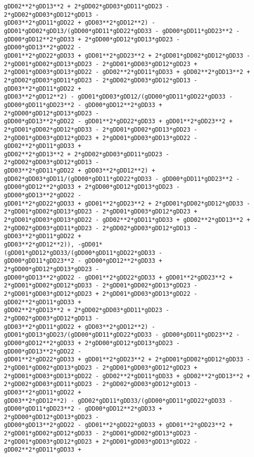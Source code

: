 \documentclass[landscape,letterpaper,10pt,english]{article}
\begin{document}
\begin{Verbatim}[commandchars=\\\{\}]
gDD02**2*gDD13**2 + 2*gDD02*gDD03*gDD11*gDD23 - 2*gDD02*gDD03*gDD12*gDD13 -
gDD03**2*gDD11*gDD22 + gDD03**2*gDD12**2) -
gDD01*gDD02*gDD13/(gDD00*gDD11*gDD22*gDD33 - gDD00*gDD11*gDD23**2 -
gDD00*gDD12**2*gDD33 + 2*gDD00*gDD12*gDD13*gDD23 - gDD00*gDD13**2*gDD22 -
gDD01**2*gDD22*gDD33 + gDD01**2*gDD23**2 + 2*gDD01*gDD02*gDD12*gDD33 -
2*gDD01*gDD02*gDD13*gDD23 - 2*gDD01*gDD03*gDD12*gDD23 +
2*gDD01*gDD03*gDD13*gDD22 - gDD02**2*gDD11*gDD33 + gDD02**2*gDD13**2 +
2*gDD02*gDD03*gDD11*gDD23 - 2*gDD02*gDD03*gDD12*gDD13 - gDD03**2*gDD11*gDD22 +
gDD03**2*gDD12**2) - gDD01*gDD03*gDD12/(gDD00*gDD11*gDD22*gDD33 -
gDD00*gDD11*gDD23**2 - gDD00*gDD12**2*gDD33 + 2*gDD00*gDD12*gDD13*gDD23 -
gDD00*gDD13**2*gDD22 - gDD01**2*gDD22*gDD33 + gDD01**2*gDD23**2 +
2*gDD01*gDD02*gDD12*gDD33 - 2*gDD01*gDD02*gDD13*gDD23 -
2*gDD01*gDD03*gDD12*gDD23 + 2*gDD01*gDD03*gDD13*gDD22 - gDD02**2*gDD11*gDD33 +
gDD02**2*gDD13**2 + 2*gDD02*gDD03*gDD11*gDD23 - 2*gDD02*gDD03*gDD12*gDD13 -
gDD03**2*gDD11*gDD22 + gDD03**2*gDD12**2) +
gDD02*gDD03*gDD11/(gDD00*gDD11*gDD22*gDD33 - gDD00*gDD11*gDD23**2 -
gDD00*gDD12**2*gDD33 + 2*gDD00*gDD12*gDD13*gDD23 - gDD00*gDD13**2*gDD22 -
gDD01**2*gDD22*gDD33 + gDD01**2*gDD23**2 + 2*gDD01*gDD02*gDD12*gDD33 -
2*gDD01*gDD02*gDD13*gDD23 - 2*gDD01*gDD03*gDD12*gDD23 +
2*gDD01*gDD03*gDD13*gDD22 - gDD02**2*gDD11*gDD33 + gDD02**2*gDD13**2 +
2*gDD02*gDD03*gDD11*gDD23 - 2*gDD02*gDD03*gDD12*gDD13 - gDD03**2*gDD11*gDD22 +
gDD03**2*gDD12**2)), -gDD01*(gDD01*gDD12*gDD33/(gDD00*gDD11*gDD22*gDD33 -
gDD00*gDD11*gDD23**2 - gDD00*gDD12**2*gDD33 + 2*gDD00*gDD12*gDD13*gDD23 -
gDD00*gDD13**2*gDD22 - gDD01**2*gDD22*gDD33 + gDD01**2*gDD23**2 +
2*gDD01*gDD02*gDD12*gDD33 - 2*gDD01*gDD02*gDD13*gDD23 -
2*gDD01*gDD03*gDD12*gDD23 + 2*gDD01*gDD03*gDD13*gDD22 - gDD02**2*gDD11*gDD33 +
gDD02**2*gDD13**2 + 2*gDD02*gDD03*gDD11*gDD23 - 2*gDD02*gDD03*gDD12*gDD13 -
gDD03**2*gDD11*gDD22 + gDD03**2*gDD12**2) -
gDD01*gDD13*gDD23/(gDD00*gDD11*gDD22*gDD33 - gDD00*gDD11*gDD23**2 -
gDD00*gDD12**2*gDD33 + 2*gDD00*gDD12*gDD13*gDD23 - gDD00*gDD13**2*gDD22 -
gDD01**2*gDD22*gDD33 + gDD01**2*gDD23**2 + 2*gDD01*gDD02*gDD12*gDD33 -
2*gDD01*gDD02*gDD13*gDD23 - 2*gDD01*gDD03*gDD12*gDD23 +
2*gDD01*gDD03*gDD13*gDD22 - gDD02**2*gDD11*gDD33 + gDD02**2*gDD13**2 +
2*gDD02*gDD03*gDD11*gDD23 - 2*gDD02*gDD03*gDD12*gDD13 - gDD03**2*gDD11*gDD22 +
gDD03**2*gDD12**2) - gDD02*gDD11*gDD33/(gDD00*gDD11*gDD22*gDD33 -
gDD00*gDD11*gDD23**2 - gDD00*gDD12**2*gDD33 + 2*gDD00*gDD12*gDD13*gDD23 -
gDD00*gDD13**2*gDD22 - gDD01**2*gDD22*gDD33 + gDD01**2*gDD23**2 +
2*gDD01*gDD02*gDD12*gDD33 - 2*gDD01*gDD02*gDD13*gDD23 -
2*gDD01*gDD03*gDD12*gDD23 + 2*gDD01*gDD03*gDD13*gDD22 - gDD02**2*gDD11*gDD33 +

\end{Verbatim}
\end{document}
